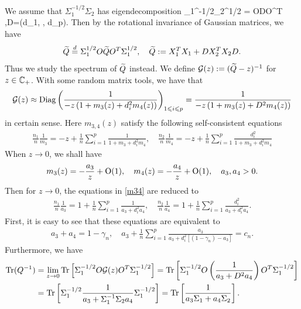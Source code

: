  We assume that $ \Sigma_1^{-1/2}\Sigma_2$ has eigendecomposition
\be  \label{eigen}
\Sigma_1^{-1/2}\Sigma_2^{1/2} = ODO^T ,\quad D=(d_1, \cdots, d_p).
\ee
Then by the rotational invariance of Gaussian matrices, we have
$$\widetilde Q \overset{d}{=}\Sigma_1^{1/2} O \widetilde Q O^T \Sigma_1^{1/2},\quad \widetilde Q:=   X_1^T X_1  + D X_2^T X_2 D .$$
Thus we study the spectrum of $\widetilde Q$ instead. We define $\mathcal G(z):= (\widetilde Q-z)^{-1}$ for $z\in \mathbb{C}_+$. With some random matrix tools, we have that 
$$\mathcal G(z) \approx \operatorname{Diag}\left( \frac{1}{-z\left( 1+ m_3(z) + d_i^2 m_4(z)\right)}\right)_{1\leqslant i \leqslant p}= \frac{1}{-z\left( 1+ m_3(z) + D^2 m_4(z)\right)} $$
{\cob in certain sense}. Here $m_{3,4}(z)$ satisfy the following self-consistent equations
\begin{align}\label{m34}
\frac{n_1}{n}\frac1{m_3} = - z +\frac1n\sum_{i=1}^p \frac1{  1+m_3 + d_i^2m_4  } ,\quad \frac{n_2}{n}\frac1{m_4} = - z +\frac1n\sum_{i=1}^p \frac{d_i^2 }{  1+m_3 + d_i^2m_4  } 
\end{align}
When $z\to 0$, we shall have
$$m_3(z)= - \frac{a_3}{z} + \operatorname{O}(1), \quad m_4(z)= - \frac{a_4}{z} + \operatorname{O}(1),\quad a_3,a_4>0.$$
Then for $z\to0$, the equations in \eqref{m34} are reduced to
\begin{align}\label{m35}
\frac{n_1}{n}\frac{1}{a_3} = 1 +\frac1n\sum_{i=1}^p \frac{1}{a_3 + d_i^2a_4  } ,\quad \frac{n_2}{n}\frac1{a_4} = 1 +\frac1n\sum_{i=1}^p \frac{d_i^2 }{  a_3 + d_i^2 a_4 }. 
\end{align}
First, it is easy to see that these equations are equivalent to
\begin{align} a_3 + a_4 = 1- \gamma_n, \quad a_3 +\frac1n\sum_{i=1}^p \frac{a_3}{a_3 + d_i^2[(1-\gamma_n)-a_3]  }=c_n  .\end{align}
Furthermore, we have
\begin{align*}
\operatorname{Tr} (Q^{-1}) &= \lim_{z\to 0}\operatorname{Tr} \left[\Sigma_1^{-1/2} O \mathcal G(z)O^T \Sigma_1^{-1/2}\right]
=\operatorname{Tr} \left[\Sigma_1^{-1/2} O  \left( \frac{1}{a_3 + D^2 a_4 }\right) O^T \Sigma_1^{-1/2}\right] \\
&=\operatorname{Tr} \left[\Sigma_1^{-1/2}  \frac{1}{a_3+ \Sigma_1^{-1}\Sigma_2 a_4} \Sigma_1^{-1/2}\right]=\operatorname{Tr} \left[ \frac{1}{a_3\Sigma_1 + a_4\Sigma_2 } \right].
\end{align*}

